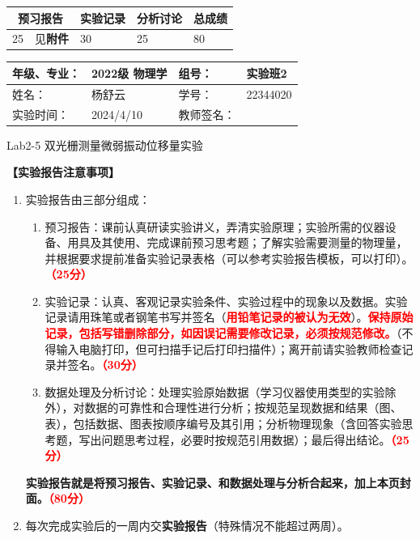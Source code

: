 \documentclass[dvipsnames, svgnames,a4paper,11pt]{article}
\begin{document}
	
	
	
	
	\begin{table}
		\renewcommand\arraystretch{1.7}
		\begin{tabularx}{\textwidth}{
				|X|X|X|X
				|X|X|X|X|}
			\hline
			\multicolumn{2}{|c|}{预习报告}&\multicolumn{2}{|c|}{实验记录}&\multicolumn{2}{|c|}{分析讨论}&\multicolumn{2}{|c|}{总成绩}\\
			\hline
			\LARGE25 & \small 见\textbf{附件} & \LARGE30 & & \LARGE25 & & \LARGE80 & \\
			\hline
		\end{tabularx}
	\end{table}
	
	\begin{table}
		\renewcommand\arraystretch{1.7}
		\begin{tabularx}{\textwidth}{|X|X|X|X|}
			\hline
			年级、专业： & 2022级 物理学 &组号： & 实验班2\\
			\hline
			姓名： & 杨舒云  & 学号： & 22344020\\
			\hline
			实验时间： & 2024/4/10 & 教师签名： & \\
			\hline
		\end{tabularx}
	\end{table}
	
	\begin{center}
		\LARGE Lab2-5 \quad 双光栅测量微弱振动位移量实验
	\end{center}
	
	
	\textbf{【实验报告注意事项】}
	\begin{enumerate}
		\item 实验报告由三部分组成：
		\begin{enumerate}
			\item 预习报告：课前认真研读实验讲义，弄清实验原理；实验所需的仪器设备、用具及其使用、完成课前预习思考题；了解实验需要测量的物理量，并根据要求提前准备实验记录表格（可以参考实验报告模板，可以打印）。\textcolor{red}{\textbf{（25分）}}
			\item 实验记录：认真、客观记录实验条件、实验过程中的现象以及数据。实验记录请用珠笔或者钢笔书写并签名（\textcolor{red}{\textbf{用铅笔记录的被认为无效}}）。\textcolor{red}{\textbf{保持原始记录，包括写错删除部分，如因误记需要修改记录，必须按规范修改。}}（不得输入电脑打印，但可扫描手记后打印扫描件）；离开前请实验教师检查记录并签名。\textcolor{red}{\textbf{（30分）}}
			\item 数据处理及分析讨论：处理实验原始数据（学习仪器使用类型的实验除外），对数据的可靠性和合理性进行分析；按规范呈现数据和结果（图、表），包括数据、图表按顺序编号及其引用；分析物理现象（含回答实验思考题，写出问题思考过程，必要时按规范引用数据）；最后得出结论。\textcolor{red}{\textbf{（25分）}}
		\end{enumerate}
		\textbf{实验报告就是将预习报告、实验记录、和数据处理与分析合起来，加上本页封面。\textcolor{red}{（80分）}}
		\item 每次完成实验后的一周内交\textbf{实验报告}（特殊情况不能超过两周）。
	\end{enumerate}
	
\end{document}
